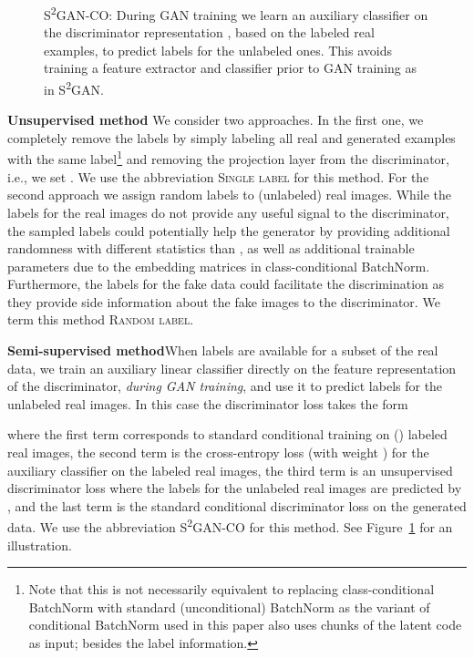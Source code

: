 \documentclass{article}
\newcommand{\cotrainSS}{\textsc{S\textsuperscript{2}GAN-CO}}
\newcommand{\tranSS}{\textsc{S\textsuperscript{2}GAN}}
\newcommand{\slabels}{\textsc{Single label}}
\newcommand{\rlabels}{\textsc{Random label}}
\begin{document}
\begin{figure}[t]
\centering
{}
\caption{\cotrainSS{}: During GAN training we learn an auxiliary classifier  on the discriminator representation , based on the labeled real examples, to predict labels for the unlabeled ones. This avoids training a feature extractor  and classifier  prior to GAN training as in \tranSS{}. \label{fig:cotrained}} 
\end{figure}
\textbf{Unsupervised method}\quad
We consider two approaches. In the first one, we completely remove the labels by simply labeling all real and generated examples with the same label\footnote{Note that this is not necessarily equivalent to replacing class-conditional BatchNorm with standard (unconditional) BatchNorm as the variant of conditional BatchNorm used in this paper also uses chunks of the latent code as input;  besides the label information.} and removing the projection layer from the discriminator, i.e., we set . We use the abbreviation \slabels{} for this method. For the second approach we assign random labels to (unlabeled) real images. While the labels for the real images do not provide any useful signal to the discriminator, the sampled labels could potentially help the generator by providing additional randomness with different statistics than , as well as additional trainable parameters due to the embedding matrices in class-conditional BatchNorm. Furthermore, the labels for the fake data could facilitate the discrimination as they provide side information about the fake images to the discriminator. We term this method \rlabels{}.

\textbf{Semi-supervised method}\quad When labels are available for a subset of the real data, we train an auxiliary linear classifier  directly on the feature representation  of the discriminator, \emph{during GAN training}, and use it to predict labels for the unlabeled real images. In this case the discriminator loss takes the form

where the first term corresponds to standard conditional training on () labeled real images, the second term is the cross-entropy loss (with weight ) for the auxiliary classifier  on the labeled real images, the third term is an unsupervised discriminator loss where the labels for the unlabeled real images are predicted by , and the last term is the standard conditional discriminator loss on the generated data. We use the abbreviation \cotrainSS{} for this method. See Figure~\ref{fig:cotrained} for an illustration.
\end{document}
